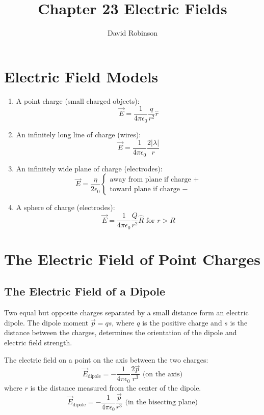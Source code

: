 \documentclass{article}
\title{Chapter 23 Electric Fields}
\author{David Robinson}
\date{}
\begin{document}
\maketitle

\section*{Electric Field Models}

\begin{enumerate}
    \item A point charge (small charged objects):
    \[\vec{E}=\frac{1}{4\pi\epsilon_0}\frac{q}{r^2}\hat{r}\]
    \item An infinitely long line of charge (wires):
    \[\vec{E}=\frac{1}{4\pi\epsilon_0}\frac{2|\lambda |}{r}\]
    \item An infinitely wide plane of charge (electrodes):
    \[\vec{E}=\frac{\eta}{2\epsilon_0}\begin{cases}
        \text{away from plane if charge } + \\
        \text{toward plane if charge } -
    \end{cases}\]
    \item A sphere of charge (electrodes):
    \[\vec{E}=\frac{1}{4\pi\epsilon_0}\frac{Q}{r^2}\hat{R}\text{ for }r > R\]
\end{enumerate}

\section*{The Electric Field of Point Charges}

\subsection*{The Electric Field of a Dipole}

Two equal but opposite charges separated by a small distance form an electric dipole. The dipole
moment $\vec{p}=qs$, where $q$ is the positive charge and $s$ is the distance between the charges,
determines the orientation of the dipole and electric field strength. \newline

The electric field on a point on the axis between the two charges:
\[\vec{E}_{\text{dipole}}=-\frac{1}{4\pi\epsilon_0}\frac{2\vec{p}}{r^3} \text{ (on the axis)}\]
where $r$ is the distance measured from the center of the dipole.
\[\vec{E}_{\text{dipole}}=-\frac{1}{4\pi\epsilon_0}\frac{\vec{p}}{r^3} 
\text{ (in the bisecting plane)}\]
\end{document}
